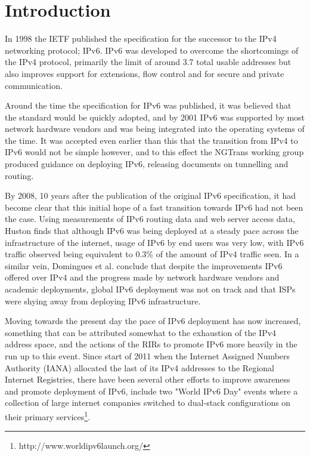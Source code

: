 \section{Introduction}

In 1998 the IETF published the specification for the successor to the IPv4
networking protocol; IPv6. IPv6 was developed to overcome the shortcomings
of the IPv4 protocol, primarily the limit of around 3.7 total usable
addresses\cite{beijnum_ip_????} but also improves support for extensions, flow
control and for secure and private communication\cite{rfc2460}.

Around the time the specification for IPv6 was published, it was believed that
the standard would be quickly adopted, and by 2001 IPv6 was supported by most
network hardware vendors and was being integrated into the operating systems of
the time\cite{huang_ipv6_2000}\cite{durand_deploying_2001}. It was accepted even
earlier than this that
the transition from IPv4 to IPv6 would not be simple however, and to this effect
the NGTrans working group produced guidance on deploying IPv6, releasing
documents on tunnelling\cite{rfc1933}\cite{rfc2893} and routing\cite{rfc2185}. 

By 2008, 10 years after the publication of the original IPv6
specification, it had become clear that this initial hope of a fast
transition towards IPv6 had not been the case. Using measurements of IPv6 routing
data and web server access data, Huston finds that although IPv6 was being
deployed at a steady pace across the infrastructure of the internet, usage of
IPv6 by end users was very low, with IPv6 traffic observed being equivalent to
0.3\% of the amount of IPv4 traffic seen\cite{huston_ipv6_2008}. In a similar vein, Domingues 
et al. conclude that despite the improvements IPv6 offered over IPv4
and the progress made by network hardware vendors and academic deployments,
global IPv6 deployment was not on track and that ISPs were shying away from
deploying IPv6 infrastructure\cite{domingues_is_2007}.

Moving towards the present day the pace of IPv6 deployment has now increased,
something that can be attributed somewhat to the exhaustion of the IPv4 address
space, and the actions of the RIRs to promote IPv6 more heavily in the run up to
this event. Since start of 2011 when the Internet Assigned Numbers Authority (IANA)
allocated the last of its IPv4 addresses to the Regional Internet Registries,
there have been several other efforts to improve awareness and promote
deployment of IPv6, include two "World IPv6 Day" events where a collection of
large internet companies switched to dual-stack configurations on their primary
services\footnote[1]{http://www.worldipv6launch.org/}.

